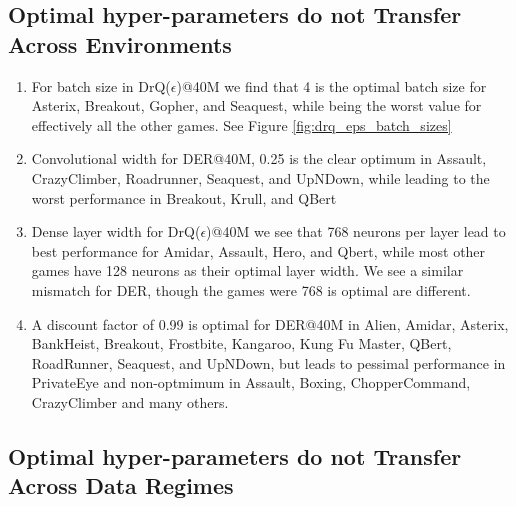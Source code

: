 \subsection{Optimal hyper-parameters do not Transfer Across Environments}
\begin{enumerate}
    \item For batch size in DrQ($\epsilon$)@40M we find that 4 is the optimal batch size for Asterix, Breakout, Gopher, and Seaquest, while being the worst value for effectively all the other games. See Figure \ref{fig:drq_eps_batch_sizes}
    \item Convolutional width for DER@40M, 0.25 is the clear optimum in Assault, CrazyClimber, Roadrunner, Seaquest, and UpNDown, while leading to the worst performance in Breakout, Krull, and QBert
    \item Dense layer width for DrQ($\epsilon$)@40M we see that 768 neurons per layer lead to best performance for Amidar, Assault, Hero, and Qbert, while most other games have 128 neurons as their optimal layer width. We see a similar mismatch for DER, though the games were 768 is optimal are different.
    \item A discount factor of 0.99 is optimal for DER@40M in Alien, Amidar, Asterix, BankHeist, Breakout, Frostbite, Kangaroo, Kung Fu Master, QBert, RoadRunner, Seaquest, and UpNDown, but leads to pessimal performance in PrivateEye and non-optmimum in Assault, Boxing, ChopperCommand, CrazyClimber and many others.
\end{enumerate}

\subsection{Optimal hyper-parameters do not Transfer Across Data Regimes}

